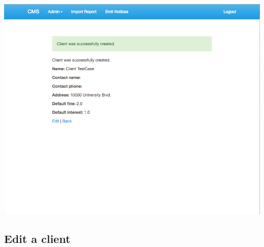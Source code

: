 \begin{itemize}
    \includegraphics[scale=0.25]{./images/ss/client/create/5.png}
\end{itemize}

\subsection*{Edit a client}

